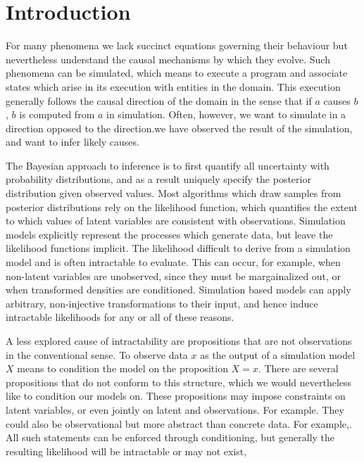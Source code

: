 \section{Introduction}

For many phenomena we lack succinct equations governing their behaviour but nevertheless understand the causal mechanisms by which they evolve.
Such phenomena can be simulated, which means to execute a program and associate states which arise in its execution with entities in the domain.
This execution generally follows the causal direction of the domain in the sense that if $a$ causes $b$, $b$ is computed from $a$ in simulation.
Often, however, we want to simulate in a direction opposed to the direction.we have observed the result of the simulation, and want to infer likely causes.



The Bayesian approach to inference is to first quantify all uncertainty with probability distributions, and as a result uniquely specify the posterior distribution given observed values.
Most algorithms which draw samples from posterior distributions rely on
the likelihood function, which quantifies the extent to which values of latent variables are consistent with observations.
Simulation models explicitly represent the processes which generate data, but leave the likelihood functions implicit. 
The likelihood  difficult to derive from a simulation model and is often intractable to evaluate.
This can occur, for example, when non-latent variables are unobserved, since they must be margainalized out, or when transformed densities are conditioned.
Simulation based models can apply arbitrary, non-injective transformations to their input, and hence induce intractable likelihoods for any or all of these reasons.

A less explored cause of intractability are propositions that are not observations in the conventional sense.
To observe data $x$ as the output of a simulation model $X$ means to condition the model on the proposition $X = x$.
There are several propositions that do not conform to this structure, which we would nevertheless like to condition our models on.
These propositions may impose constraints on latent variables, or even jointly on latent and observations.
For example.
They could also be observational but more abstract than concrete data.
For example,.
All such statements can be enforced through conditioning, but generally the resulting likelihood will be intractable or may not exist,

